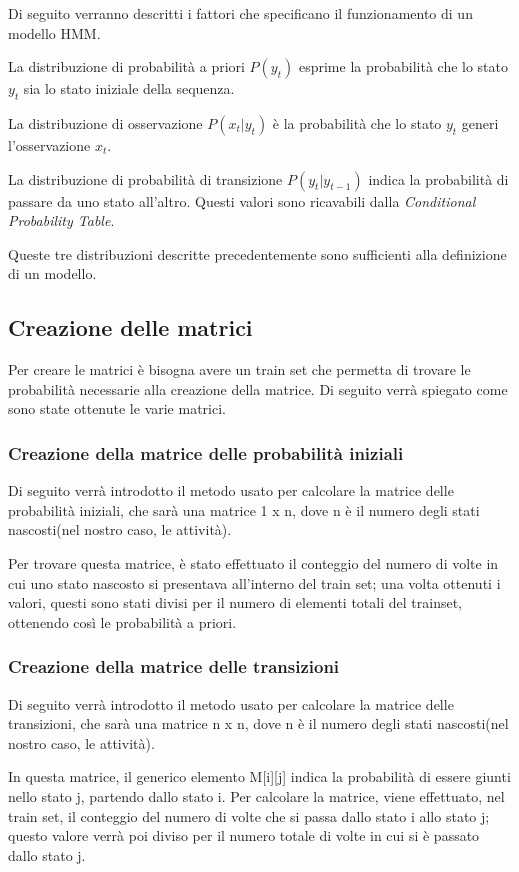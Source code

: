 \documentclass[10pt,a4paper]{article}
\begin{document}
Di seguito verranno descritti i fattori che specificano il funzionamento di un modello HMM.

La distribuzione di probabilità a priori $ P(y_{t}) $ esprime la probabilità che lo stato $ y_{t} $ sia lo stato iniziale della sequenza.

La distribuzione di osservazione $ P(x_{t} | y_{t}) $ è la probabilità che lo stato $ y_{t} $ generi l'osservazione $ x_{t} $.

La distribuzione di probabilità di transizione $ P(y_{t} | y_{t - 1}) $ indica la probabilità di passare da uno stato all'altro. Questi valori sono ricavabili dalla \textit{Conditional Probability Table}.

Queste tre distribuzioni descritte precedentemente sono sufficienti alla definizione di un modello.

\subsection{Creazione delle matrici}
Per creare le matrici è bisogna avere un train set che permetta di trovare le probabilità necessarie alla creazione della matrice.
Di seguito verrà spiegato come sono state ottenute le varie matrici.

\subsubsection{Creazione della matrice delle probabilità iniziali}
Di seguito verrà introdotto il metodo usato per calcolare la matrice delle probabilità iniziali, che sarà una matrice  1 x n, dove n è il numero degli stati nascosti(nel nostro caso, le attività).

Per trovare questa matrice, è stato effettuato il conteggio del numero di volte in cui uno stato nascosto si presentava all'interno del train set; una volta ottenuti i valori, questi sono stati divisi per il numero di elementi totali del trainset, ottenendo così le probabilità a priori.

\subsubsection{Creazione della matrice delle transizioni}
Di seguito verrà introdotto il metodo usato per calcolare la matrice delle transizioni, che sarà una matrice  n x n, dove n è il numero degli stati nascosti(nel nostro caso, le attività).

In questa matrice, il generico elemento M[i][j] indica la probabilità di essere giunti nello stato j, partendo dallo stato i. Per calcolare la matrice, viene effettuato, nel train set, il conteggio del numero di volte che si passa dallo stato i allo stato j; questo valore verrà poi diviso per il numero totale di volte in cui si è passato dallo stato j.
\end{document}
